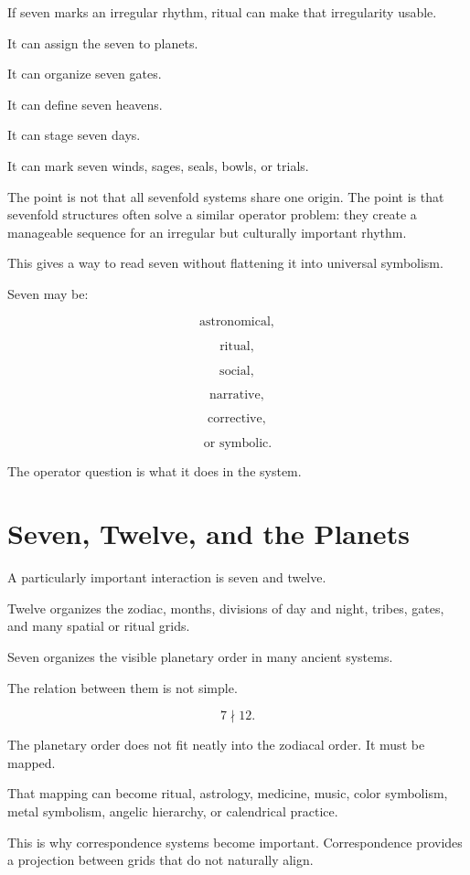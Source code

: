 \documentclass[11pt]{book}
\begin{document}
If seven marks an irregular rhythm, ritual can make that irregularity usable.

It can assign the seven to planets.

It can organize seven gates.

It can define seven heavens.

It can stage seven days.

It can mark seven winds, sages, seals, bowls, or trials.

The point is not that all sevenfold systems share one origin. The point is that sevenfold structures often solve a similar operator problem: they create a manageable sequence for an irregular but culturally important rhythm.

This gives a way to read seven without flattening it into universal symbolism.

Seven may be:

\[
\text{astronomical},
\]

\[
\text{ritual},
\]

\[
\text{social},
\]

\[
\text{narrative},
\]

\[
\text{corrective},
\]

\[
\text{or symbolic}.
\]

The operator question is what it does in the system.

\section{Seven, Twelve, and the Planets}

A particularly important interaction is seven and twelve.

Twelve organizes the zodiac, months, divisions of day and night, tribes, gates, and many spatial or ritual grids.

Seven organizes the visible planetary order in many ancient systems.

The relation between them is not simple.

\[
7 \nmid 12.
\]

The planetary order does not fit neatly into the zodiacal order. It must be mapped.

That mapping can become ritual, astrology, medicine, music, color symbolism, metal symbolism, angelic hierarchy, or calendrical practice.

This is why correspondence systems become important. Correspondence provides a projection between grids that do not naturally align.
\end{document}
